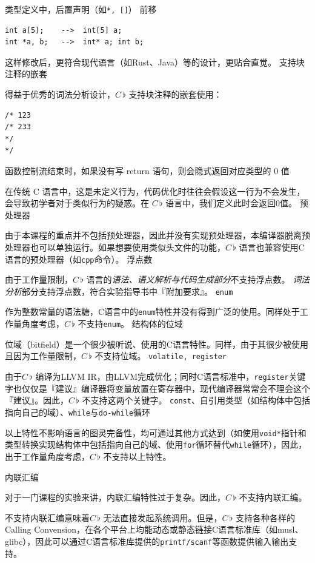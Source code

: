 \documentclass{ctexrep}
\newcommand{\cb}{$C\,\flat$\xspace}
\begin{document}
\begin{outline}[enumerate]
    \1 类型定义中，后置声明（如\texttt{*, []}） 前移
\begin{verbatim}
int a[5];    -->  int[5] a;
int *a, b;   -->  int* a; int b;
\end{verbatim}
        这样修改后，更符合现代语言（如Rust、Java）等的设计，更贴合直觉。
    \1 支持块注释的嵌套

        得益于优秀的词法分析设计，\cb 支持块注释的嵌套使用：
\begin{verbatim}
/* 123
/* 233
*/
*/
\end{verbatim}
    \1 函数控制流结束时，如果没有写 return 语句，则会隐式返回对应类型的 0 值
        
        在传统 C 语言中，这是未定义行为，代码优化时往往会假设这一行为不会发生，会导致初学者对于类似行为的疑惑。在 \cb 语言中，我们定义此时会返回0值。
    \1 预处理器

        由于本课程的重点并不包括预处理器，因此并没有实现预处理器，本编译器脱离预处理器也可以单独运行。如果想要使用类似头文件的功能，\cb 语言也兼容使用C语言的预处理器（如\texttt{cpp}命令）。
    \1 浮点数

        由于工作量限制，\cb 语言的\emph{语法、语义解析与代码生成部分}不支持浮点数。
        \emph{词法分析}部分支持浮点数，符合实验指导书中『附加要求』。
    \1 \texttt{enum}

        作为整数常量的语法糖，C语言中的\texttt{enum}特性并没有得到广泛的使用。同样处于工作量角度考虑，\cb 不支持\texttt{enum}。
    \1 结构体的位域

        位域（bitfield）是一个很少被听说、使用的C语言特性。同样，由于其很少被使用且因为工作量限制，\cb 不支持位域。
    \1 \texttt{volatile, register}

        由于\cb 编译为LLVM IR，由LLVM完成优化；同时C语言标准中，\texttt{register}关键字也仅仅是『建议』编译器将变量放置在寄存器中，现代编译器常常会不理会这个『建议』。因此，\cb 不支持这两个关键字。
    \1 \texttt{const}、自引用类型（如结构体中包括指向自己的域）、\texttt{while}与\texttt{do-while}循环
        
        以上特性不影响语言的图灵完备性，均可通过其他方式达到（如使用\texttt{void*}指针和类型转换实现结构体中包括指向自己的域、使用\texttt{for}循环替代\texttt{while}循环），因此，出于工作量角度考虑，\cb 不支持以上特性。
    
    \1 内联汇编

        对于一门课程的实验来讲，内联汇编特性过于复杂。因此，\cb 不支持内联汇编。

        不支持内联汇编意味着\cb 无法直接发起系统调用。但是，\cb 支持各种各样的Calling Convension，在各个平台上均能动态或静态链接C语言标准库（如musl、glibc），因此可以通过C语言标准库提供的\texttt{printf/scanf}等函数提供输入输出支持。
\end{outline}
\end{document}
